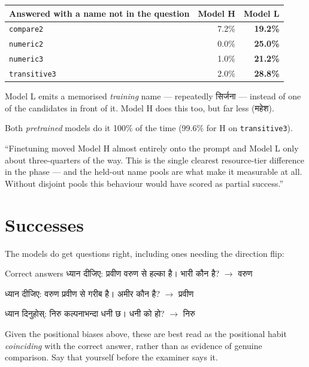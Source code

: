 \documentclass[11pt]{report}
\newcommand{\dn}[1]{{\devanagarifont #1}}
\newcommand{\p}[1]{\texttt{#1}}
\begin{document}
\begin{center}
\begin{tabular}{@{}lrr@{}}
\toprule
\textbf{Answered with a name not in the question} & \textbf{Model H} & \textbf{Model L} \\
\midrule
\p{compare2} & 7.2\% & \textbf{19.2\%} \\
\p{numeric2} & 0.0\% & \textbf{25.0\%} \\
\p{numeric3} & 1.0\% & \textbf{21.2\%} \\
\p{transitive3} & 2.0\% & \textbf{28.8\%} \\
\bottomrule
\end{tabular}
\end{center}

Model L emits a memorised \emph{training} name --- repeatedly \dn{सिर्जना} ---
instead of one of the candidates in front of it. Model H does this too, but far
less (\dn{महेश}).

Both \emph{pretrained} models do it 100\% of the time (99.6\% for H on
\p{transitive3}).

\begin{saybox}
``Finetuning moved Model H almost entirely onto the prompt and Model L only
about three-quarters of the way. This is the single clearest resource-tier
difference in the phase --- and the held-out name pools are what make it
measurable at all. Without disjoint pools this behaviour would have scored as
partial success.''
\end{saybox}

\section{Successes}

The models do get questions right, including ones needing the direction flip:

\begin{example}{Correct answers}
\dn{ध्यान दीजिए: प्रवीण वरुण से हल्का है। भारी कौन है?} $\rightarrow$ \dn{वरुण} \checkmark

\medskip
\dn{ध्यान दीजिए: वरुण प्रवीण से गरीब है। अमीर कौन है?} $\rightarrow$ \dn{प्रवीण} \checkmark

\medskip
\dn{ध्यान दिनुहोस्: निरु कल्पनाभन्दा धनी छ। धनी को हो?} $\rightarrow$ \dn{निरु} \checkmark
\end{example}

\begin{warnbox}
Given the positional biases above, these are best read as the positional habit
\emph{coinciding} with the correct answer, rather than as evidence of genuine
comparison. Say that yourself before the examiner says it.
\end{warnbox}
\end{document}
